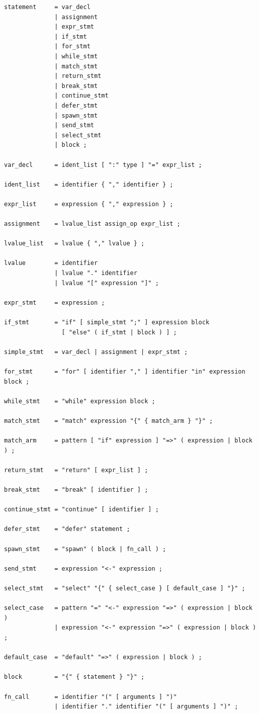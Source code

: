 \begin{lstlisting}[language=EBNF]
statement     = var_decl
              | assignment
              | expr_stmt
              | if_stmt
              | for_stmt
              | while_stmt
              | match_stmt
              | return_stmt
              | break_stmt
              | continue_stmt
              | defer_stmt
              | spawn_stmt
              | send_stmt
              | select_stmt
              | block ;

var_decl      = ident_list [ ":" type ] "=" expr_list ;

ident_list    = identifier { "," identifier } ;

expr_list     = expression { "," expression } ;

assignment    = lvalue_list assign_op expr_list ;

lvalue_list   = lvalue { "," lvalue } ;

lvalue        = identifier
              | lvalue "." identifier
              | lvalue "[" expression "]" ;

expr_stmt     = expression ;

if_stmt       = "if" [ simple_stmt ";" ] expression block
                [ "else" ( if_stmt | block ) ] ;

simple_stmt   = var_decl | assignment | expr_stmt ;

for_stmt      = "for" [ identifier "," ] identifier "in" expression block ;

while_stmt    = "while" expression block ;

match_stmt    = "match" expression "{" { match_arm } "}" ;

match_arm     = pattern [ "if" expression ] "=>" ( expression | block ) ;

return_stmt   = "return" [ expr_list ] ;

break_stmt    = "break" [ identifier ] ;

continue_stmt = "continue" [ identifier ] ;

defer_stmt    = "defer" statement ;

spawn_stmt    = "spawn" ( block | fn_call ) ;

send_stmt     = expression "<-" expression ;

select_stmt   = "select" "{" { select_case } [ default_case ] "}" ;

select_case   = pattern "=" "<-" expression "=>" ( expression | block )
              | expression "<-" expression "=>" ( expression | block ) ;

default_case  = "default" "=>" ( expression | block ) ;

block         = "{" { statement } "}" ;

fn_call       = identifier "(" [ arguments ] ")"
              | identifier "." identifier "(" [ arguments ] ")" ;
\end{lstlisting}

